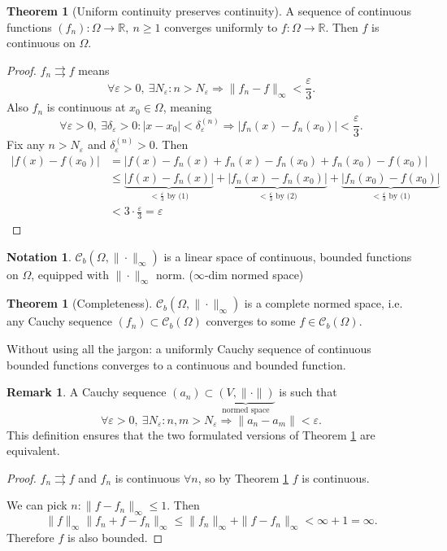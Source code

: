\documentclass[a4paper]{article}
\theoremstyle{definition}
\newtheorem{thm}[defn]{Theorem}
\newtheorem*{remark}{Remark}
\newtheorem*{notation}{Notation}
\begin{document}
\begin{thm}[Uniform continuity preserves continuity]
\label{thm:unicontpreservescont}
A sequence of continuous functions $(f_n):\Omega \rightarrow \mathbb R,\ n\geq 1$ converges uniformly to $f:\Omega \rightarrow \mathbb R$. Then $f$ is continuous on $\Omega$.
\end{thm}
\begin{proof}
$f_n\rightrightarrows f$ means \begin{equation}\forall \varepsilon >0, \ \exists N_\varepsilon : n>N_\varepsilon \Rightarrow \|f_n-f\|_\infty < \frac{\varepsilon}{3} .\end{equation} Also $f_n$ is continuous at $x_0\in \Omega$, meaning \begin{equation}\forall \varepsilon >0, \ \exists \delta_\varepsilon >0 : |x-x_0|<\delta_\varepsilon^{(n)} \Rightarrow |f_n(x)-f_n(x_0)|<\frac{\varepsilon}{3} .\end{equation} Fix any $n>N_\varepsilon$ and $\delta_\varepsilon^{(n)} >0$. Then
\[
\begin{aligned}|f(x)-f(x_0)|&=|f(x)-f_n(x)+f_n(x)-f_n(x_0)+f_n(x_0)-f(x_0)|\\&\leq \underbrace{|f(x)-f_n(x)|}_{<\frac{\varepsilon}{3}\text{ by (1)}}+\underbrace{|f_n(x)-f_n(x_0)|}_{<\frac{\varepsilon}{3}\text{ by (2)}}+\underbrace{|f_n(x_0)-f(x_0)|}_{<\frac{\varepsilon}{3}\text{ by (1)}} \\ &<3\cdot \frac{\varepsilon}{3}=\varepsilon\end{aligned}
\]
\end{proof}
\begin{notation}
$\mathcal C_b (\Omega, \|\cdot\|_\infty)$ is a linear space of continuous, bounded functions on $\Omega$, equipped with $\|\cdot \|_\infty$ norm. ($\infty$-dim normed space)
\end{notation}
\begin{thm}[Completeness]
\label{thm:completeness}
$\mathcal C_b (\Omega, \|\cdot\|_\infty)$ is a complete normed space, i.e. any Cauchy sequence $(f_n)\subset \mathcal C_b(\Omega)$ converges to some $f\in \mathcal C_b (\Omega)$.

Without using all the jargon: a uniformly Cauchy sequence of continuous bounded functions converges to a continuous and bounded function.
\end{thm}
\begin{remark}
A Cauchy sequence $(a_n)\subset \underbrace{(V,\|\cdot\|)}_{\text{normed space}}$ is such that
\[
\forall \varepsilon >0,\ \exists N_\varepsilon : n,m>N_\varepsilon \Rightarrow \|a_n-a_m\|<\varepsilon .
\]
This definition ensures that the two formulated versions of Theorem \ref{thm:completeness} are equivalent.
\end{remark}
\begin{proof}
$f_n \rightrightarrows f$ and $f_n$ is continuous $\forall n$, so by Theorem \ref{thm:unicontpreservescont} $f$ is continuous.

We can pick $n:\|f-f_n\|_\infty \leq 1$. Then
\[
\|f\|_\infty \|f_n+f-f_n\|_\infty \leq \|f_n\|_\infty+\|f-f_n\|_\infty <\infty+1=\infty .
\]
Therefore $f$ is also bounded.
\end{proof}
\end{document}
